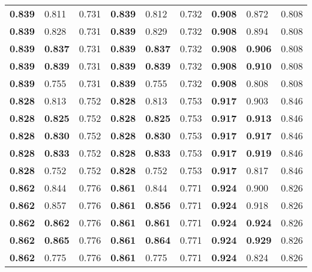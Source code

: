 \begin{tabular}{llrllrllr}
\toprule
 \bfseries 0.839 & 0.811       & 0.731 & \bfseries 0.839 & 0.812       & 0.732 & \bfseries 0.908 & 0.872       & 0.808 \\
 \bfseries 0.839 & 0.828       & 0.731 & \bfseries 0.839 & 0.829       & 0.732 & \bfseries 0.908 & 0.894       & 0.808 \\
 \bfseries 0.839 & \bfseries 0.837 & 0.731 & \bfseries 0.839 & \bfseries 0.837 & 0.732 & \bfseries 0.908 & \bfseries 0.906 & 0.808 \\
 \bfseries 0.839 & \bfseries 0.839 & 0.731 & \bfseries 0.839 & \bfseries 0.839 & 0.732 & \bfseries 0.908 & \bfseries 0.910 & 0.808 \\
 \bfseries 0.839 & 0.755       & 0.731 & \bfseries 0.839 & 0.755       & 0.732 & \bfseries 0.908 & 0.808       & 0.808 \\
 \bfseries 0.828 & 0.813       & 0.752 & \bfseries 0.828 & 0.813       & 0.753 & \bfseries 0.917 & 0.903       & 0.846 \\
 \bfseries 0.828 & \bfseries 0.825 & 0.752 & \bfseries 0.828 & \bfseries 0.825 & 0.753 & \bfseries 0.917 & \bfseries 0.913 & 0.846 \\
 \bfseries 0.828 & \bfseries 0.830 & 0.752 & \bfseries 0.828 & \bfseries 0.830 & 0.753 & \bfseries 0.917 & \bfseries 0.917 & 0.846 \\
 \bfseries 0.828 & \bfseries 0.833 & 0.752 & \bfseries 0.828 & \bfseries 0.833 & 0.753 & \bfseries 0.917 & \bfseries 0.919 & 0.846 \\
 \bfseries 0.828 & 0.752       & 0.752 & \bfseries 0.828 & 0.752       & 0.753 & \bfseries 0.917 & 0.817       & 0.846 \\
 \bfseries 0.862 & 0.844       & 0.776 & \bfseries 0.861 & 0.844       & 0.771 & \bfseries 0.924 & 0.900       & 0.826 \\
 \bfseries 0.862 & 0.857       & 0.776 & \bfseries 0.861 & \bfseries 0.856 & 0.771 & \bfseries 0.924 & 0.918       & 0.826 \\
 \bfseries 0.862 & \bfseries 0.862 & 0.776 & \bfseries 0.861 & \bfseries 0.861 & 0.771 & \bfseries 0.924 & \bfseries 0.924 & 0.826 \\
 \bfseries 0.862 & \bfseries 0.865 & 0.776 & \bfseries 0.861 & \bfseries 0.864 & 0.771 & \bfseries 0.924 & \bfseries 0.929 & 0.826 \\
 \bfseries 0.862 & 0.775       & 0.776 & \bfseries 0.861 & 0.775       & 0.771 & \bfseries 0.924 & 0.824       & 0.826 \\
\bottomrule
\end{tabular}